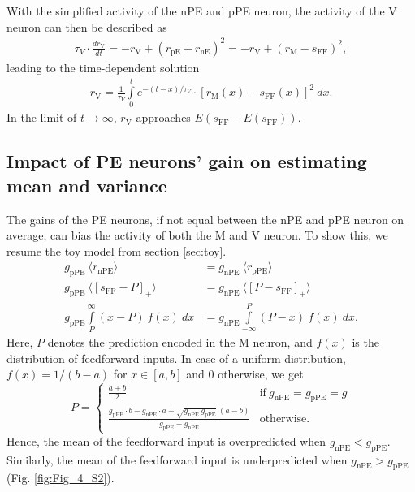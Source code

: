 \documentclass[10pt,a4paper]{article}
\begin{document}
With the simplified activity of the nPE and pPE neuron, the activity of the V neuron can then be described as
%
\begin{align}
\tau_V \cdot \frac{dr_\mathrm{V}}{dt} = -r_\mathrm{V} + (r_\mathrm{pE} +  r_\mathrm{nE})^2 = -r_\mathrm{V}  + (r_\mathrm{M} -  s_\mathrm{FF})^2,
\end{align}
%
leading to the time-dependent solution
%
\begin{align}
r_\mathrm{V} = \frac{1}{\tau_V} \int\limits_0^t e^{-(t-x)/\tau_V}\cdot \left[r_\mathrm{M}(x) -  s_\mathrm{FF}(x)\right]^2\ dx.
\end{align}  
%
In the limit of $t\rightarrow \infty$, $r_\mathrm{V}$ approaches $E(s_\mathrm{FF} - E(s_\mathrm{FF}))$.


\subsection{Impact of PE neurons' gain on estimating mean and variance}\label{sec:impact_gain}\label{sec:gain_impact}
%
The gains of the PE neurons, if not equal between the nPE and pPE neuron on average, can bias the activity of both the M and V neuron. To show this, we resume the toy model from section \ref{sec:toy}. 
%
\begin{align}
\label{eq:condition_mean_gain_equal}
g_\mathrm{pPE}\ \langle r_\mathrm{nPE}\rangle &= g_\mathrm{nPE}\ \langle r_\mathrm{pPE}\rangle \\
g_\mathrm{pPE}\ \langle \left[ s_\mathrm{FF}-P\right]_+\rangle &= g_\mathrm{nPE}\ \langle \left[ P-s_\mathrm{FF}\right]_+\rangle \nonumber\\
g_\mathrm{pPE} \int\limits_P^{\infty} \left( x-P\right)\ f(x)\ dx &= g_\mathrm{nPE} \int\limits_{-\infty}^P \left( P-x\right)\ f(x)\ dx. \nonumber
\end{align}
%
Here, $P$ denotes the prediction encoded in the M neuron, and $f(x)$ is the distribution of feedforward inputs. In case of a uniform distribution, $f(x) = 1/(b-a)$ for $x\in [a,b]$ and $0$ otherwise, we get
%
\begin{equation}
\label{eq:prediction_gain}
    P=
    \begin{cases}
      \frac{a + b}{2} & \text{if}\ g_\mathrm{nPE} = g_\mathrm{pPE} = g \\
      \frac{g_\mathrm{pPE}\cdot b - g_\mathrm{nPE}\cdot a + \sqrt{g_\mathrm{nPE}\ g_\mathrm{pPE}}\ (a-b)}{g_\mathrm{pPE} - g_\mathrm{nPE}} & \text{otherwise.}
    \end{cases}
\end{equation}
%
Hence, the mean of the feedforward input is overpredicted when $g_\mathrm{nPE} < g_\mathrm{pPE}$. Similarly, the mean of the feedforward input is underpredicted when $g_\mathrm{nPE} > g_\mathrm{pPE}$ (Fig. \ref{fig:Fig_4_S2}).
\end{document}
